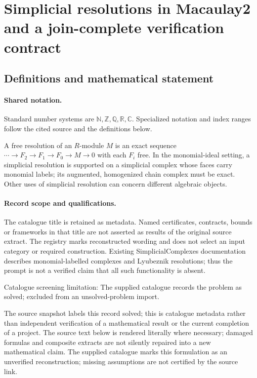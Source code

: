 \documentclass[11pt]{article}
\begin{document}
\section{Simplicial resolutions in Macaulay2 and a join-complete verification contract}\label{statement}

\subsection{Definitions and mathematical statement}

\paragraph{Shared notation.}Standard number systems are $\mathbb N,\mathbb Z,\mathbb Q,\mathbb R,\mathbb C$. Specialized notation and index ranges follow the cited source and the definitions below.


A free resolution of an $R$-module $M$ is an exact sequence $\cdots\to F_2\to F_1\to F_0\to M\to0$ with each $F_i$ free. In the monomial-ideal setting, a simplicial resolution is supported on a simplicial complex whose faces carry monomial labels; its augmented, homogenized chain complex must be exact. Other uses of simplicial resolution can concern different algebraic objects.
\paragraph{Record scope and qualifications.}
The catalogue title is retained as metadata. Named certificates, contracts, bounds or frameworks in that title are not asserted as results of the original source extract.
The registry marks reconstructed wording and does not select an input category or required construction. Existing SimplicialComplexes documentation describes monomial-labelled complexes and Lyubeznik resolutions; thus the prompt is not a verified claim that all such functionality is absent.

Catalogue screening limitation: The supplied catalogue records the problem as solved; excluded from an unsolved-problem import.

The source snapshot labels this record solved; this is catalogue metadata rather than independent verification of a mathematical result or the current completion of a project.
The source text below is rendered literally where necessary; damaged formulas and composite extracts are not silently repaired into a new mathematical claim.
The supplied catalogue marks this formulation as an unverified reconstruction; missing assumptions are not certified by the source link.
\end{document}
